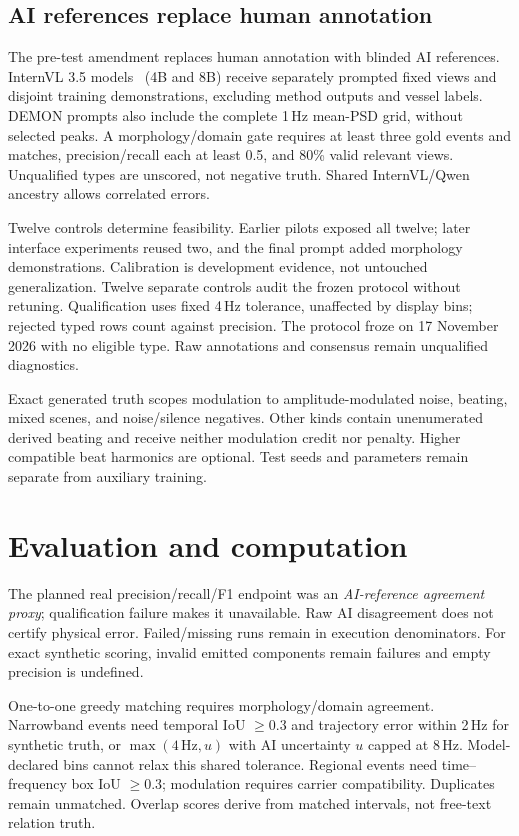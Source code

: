 \documentclass[runningheads,orivec]{llncs}
\begin{document}
\subsection{AI references replace human annotation}\label{sec:references}
The pre-test amendment replaces human annotation with blinded AI references. InternVL 3.5 models~\cite{wang2025internvl35} (4B and 8B) receive separately prompted fixed views and disjoint training demonstrations, excluding method outputs and vessel labels. DEMON prompts also include the complete 1\,Hz mean-PSD grid, without selected peaks. A morphology/domain gate requires at least three gold events and matches, precision/recall each at least 0.5, and 80\% valid relevant views. Unqualified types are unscored, not negative truth. Shared InternVL/Qwen ancestry allows correlated errors.

Twelve controls determine feasibility. Earlier pilots exposed all twelve; later interface experiments reused two, and the final prompt added morphology demonstrations. Calibration is development evidence, not untouched generalization. Twelve separate controls audit the frozen protocol without retuning. Qualification uses fixed 4\,Hz tolerance, unaffected by display bins; rejected typed rows count against precision. The protocol froze on 17 November 2026 with no eligible type. Raw annotations and consensus remain unqualified diagnostics.

Exact generated truth scopes modulation to amplitude-modulated noise, beating, mixed scenes, and noise/silence negatives. Other kinds contain unenumerated derived beating and receive neither modulation credit nor penalty. Higher compatible beat harmonics are optional. Test seeds and parameters remain separate from auxiliary training.

\section{Evaluation and computation}
The planned real precision/recall/F1 endpoint was an \emph{AI-reference agreement proxy}; qualification failure makes it unavailable. Raw AI disagreement does not certify physical error. Failed/missing runs remain in execution denominators. For exact synthetic scoring, invalid emitted components remain failures and empty precision is undefined.

One-to-one greedy matching requires morphology/domain agreement. Narrowband events need temporal IoU $\geq0.3$ and trajectory error within 2\,Hz for synthetic truth, or $\max(4\,\mathrm{Hz},u)$ with AI uncertainty $u$ capped at 8\,Hz. Model-declared bins cannot relax this shared tolerance. Regional events need time--frequency box IoU $\geq0.3$; modulation requires carrier compatibility. Duplicates remain unmatched. Overlap scores derive from matched intervals, not free-text relation truth.
\end{document}
